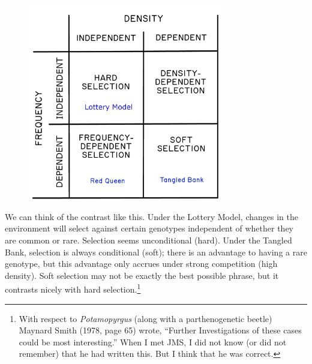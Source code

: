 \documentclass[
  letterpaper,
]{book}
\begin{document}
\begin{figure}


{\centering \includegraphics[width=0.75\textwidth,height=\textheight]{images/fig2-2.jpeg}

}

\end{figure}

We can think of the contrast like this. Under the Lottery Model, changes
in the environment will select against certain genotypes independent of
whether they are common or rare. Selection seems unconditional (hard).
Under the Tangled Bank, selection is always conditional (soft); there is
an advantage to having a rare genotype, but this advantage only accrues
under strong competition (high density). Soft selection may not be
exactly the best possible phrase, but it contrasts nicely with hard
selection.\footnote{With respect to \emph{Potamopyrgus} (along with a
  parthenogenetic beetle) Maynard Smith (1978, page 65) wrote, ``Further
  Investigations of these cases could be most interesting.'' When I met
  JMS, I did not know (or did not remember) that he had written this.
  But I think that he was correct.}
\end{document}
